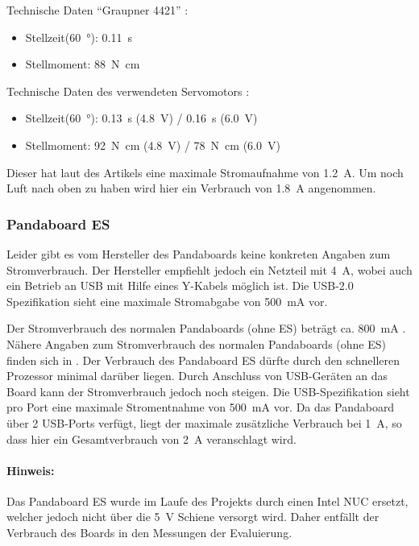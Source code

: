 Technische Daten ``Graupner 4421'' \cite{website-servo-vergleich-dat}:
\begin{itemize}
 \item Stellzeit(\SI{60}{\degree}): \SI{0,11}{\second}
 \item Stellmoment: \SI{88}{\newton\centi\meter} 
\end{itemize}


Technische Daten des verwendeten Servomotors \cite{website-servo-dat}:
\begin{itemize}
 \item Stellzeit(\SI{60}{\degree}): \SI{0,13}{\second} (\SI{4,8}{\volt}) / \SI{0,16}{\second} (\SI{6,0}{\volt})
 \item Stellmoment: \SI{92}{\newton\centi\meter} (\SI{4,8}{\volt}) / \SI{78}{\newton\centi\meter} (\SI{6,0}{\volt})
\end{itemize}



Dieser hat laut des Artikels eine maximale Stromaufnahme von \SI{1,2}{\ampere}. Um noch Luft nach oben zu haben wird hier ein Verbrauch von 
\SI{1,8}{\ampere} angenommen.

\subsubsection{Pandaboard ES}
Leider gibt es vom Hersteller des Pandaboards keine konkreten Angaben zum Stromverbrauch. Der Hersteller empfiehlt jedoch ein
Netzteil mit \SI{4}{\ampere}\cite{website-panda-supply}, wobei auch ein Betrieb an USB mit Hilfe eines Y-Kabels möglich ist. Die USB-2.0 Spezifikation\cite{website-usb-spec} sieht eine maximale 
Stromabgabe von \SI{500}{\milli\ampere} vor.

Der Stromverbrauch des normalen Pandaboards (ohne ES) beträgt ca. \SI{800}{\milli\ampere} \cite{website-panda-power}.
Nähere Angaben zum Stromverbrauch des normalen Pandaboards (ohne ES) finden sich in \cite{website-panda-power}.
Der Verbrauch des Pandaboard ES dürfte durch den schnelleren Prozessor minimal darüber liegen. 
Durch Anschluss von USB-Geräten an das Board kann der Stromverbrauch jedoch noch steigen. Die USB-Spezifikation \cite{website-usb-spec}
sieht pro Port eine maximale Stromentnahme von \SI{500}{\milli\ampere} vor. Da das Pandaboard über 2 USB-Ports verfügt, liegt der maximale zusätzliche Verbrauch bei \SI{1}{\ampere},
so dass hier ein Gesamtverbrauch von \SI{2}{\ampere} veranschlagt wird.

\paragraph{Hinweis:}
Das Pandaboard ES wurde im Laufe des Projekts durch einen Intel NUC ersetzt, welcher jedoch nicht über die \SI{5}{\volt} Schiene versorgt wird.
Daher entfällt der Verbrauch des Boards in den Messungen der Evaluierung.


